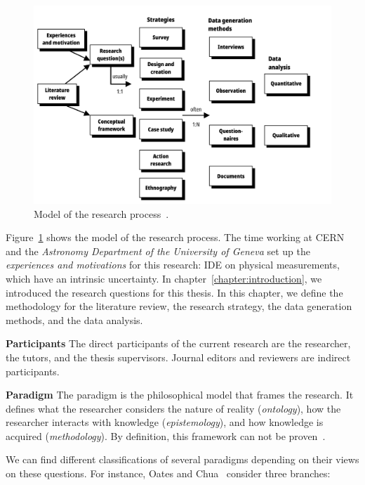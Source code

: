 \begin{figure}[htpb]
  \centering
  \includegraphics[width=\linewidth]{images/2_methodology/modelo_proceso}
  \caption[Model of the research process.]{Model of the research process~\cite{Oates2006}.}
  \label{fig:method_process_model}
\end{figure}

Figure~\ref{fig:method_process_model} shows the model of the research process.
The time working at \gls{CERN} and the \emph{Astronomy Department of the University of Geneva}
set up the \emph{experiences and motivations} for this research:
\gls{IDE} on physical measurements,
which have an intrinsic uncertainty. In chapter~\ref{chapter:introduction}, we
introduced the research questions for this thesis.
In this chapter, we define the methodology for the literature review,
the research strategy, the data generation methods, and the data analysis.

\textbf{Participants}
\label{method:participants}
The direct participants of the current research are the researcher, the tutors,
and the thesis supervisors. Journal editors and reviewers are indirect participants.

\textbf{Paradigm}
\label{method:paradigm}
The paradigm is the philosophical model that frames the research.
It defines what the researcher considers the nature
of reality (\emph{ontology}), how the researcher interacts with
knowledge (\emph{epistemology}), and how knowledge is acquired
(\emph{methodology}). By definition, this framework can not be proven~\cite{Guba1990,guba_competing_1994}.

We can find different classifications of several paradigms depending on
their views on these questions. For instance, Oates and Chua~\cite{Chua1986}
consider three branches:

